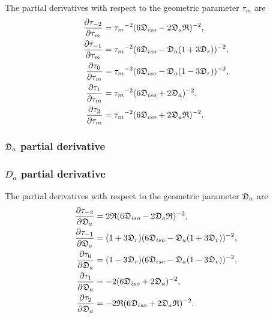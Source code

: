 The partial derivatives with respect to the geometric parameter $\tau_m$ are
\begin{subequations}
\begin{align}
    \frac{\partial \tau_{-2}}{\partial \tau_m} &= {\tau_m}^{-2} (6\mathfrak{D}_{iso} - 2\mathfrak{D}_a\mathfrak{R})^{-2}, \\
    \frac{\partial \tau_{-1}}{\partial \tau_m} &= {\tau_m}^{-2} (6\mathfrak{D}_{iso} - \mathfrak{D}_a (1 + 3\mathfrak{D}_r))^{-2}, \\
    \frac{\partial \tau_{0}}{\partial \tau_m}  &= {\tau_m}^{-2} (6\mathfrak{D}_{iso} - \mathfrak{D}_a (1 - 3\mathfrak{D}_r))^{-2}, \\
    \frac{\partial \tau_{1}}{\partial \tau_m}  &= {\tau_m}^{-2} (6\mathfrak{D}_{iso} + 2\mathfrak{D}_a)^{-2}, \\
    \frac{\partial \tau_{2}}{\partial \tau_m}  &= {\tau_m}^{-2} (6\mathfrak{D}_{iso} + 2\mathfrak{D}_a\mathfrak{R})^{-2}.
\end{align}
\end{subequations}



\begin{latexonly}
    \subsubsection{$\mathfrak{D}_a$ partial derivative}
\end{latexonly}
\begin{htmlonly}
    \subsubsection{$D_a$ partial derivative}
\end{htmlonly}

The partial derivatives with respect to the geometric parameter $\mathfrak{D}_a$ are
\begin{subequations}
\begin{align}
    \frac{\partial \tau_{-2}}{\partial \mathfrak{D}_a} &= 2\mathfrak{R} (6\mathfrak{D}_{iso} - 2\mathfrak{D}_a\mathfrak{R})^{-2}, \\
    \frac{\partial \tau_{-1}}{\partial \mathfrak{D}_a} &= (1 + 3\mathfrak{D}_r) (6\mathfrak{D}_{iso} - \mathfrak{D}_a (1 + 3\mathfrak{D}_r))^{-2}, \\
    \frac{\partial \tau_{0}}{\partial \mathfrak{D}_a}  &= (1 - 3\mathfrak{D}_r) (6\mathfrak{D}_{iso} - \mathfrak{D}_a (1 - 3\mathfrak{D}_r))^{-2}, \\
    \frac{\partial \tau_{1}}{\partial \mathfrak{D}_a}  &= -2 (6\mathfrak{D}_{iso} + 2\mathfrak{D}_a)^{-2}, \\
    \frac{\partial \tau_{2}}{\partial \mathfrak{D}_a}  &= -2\mathfrak{R} (6\mathfrak{D}_{iso} + 2\mathfrak{D}_a\mathfrak{R})^{-2}.
\end{align}
\end{subequations}



